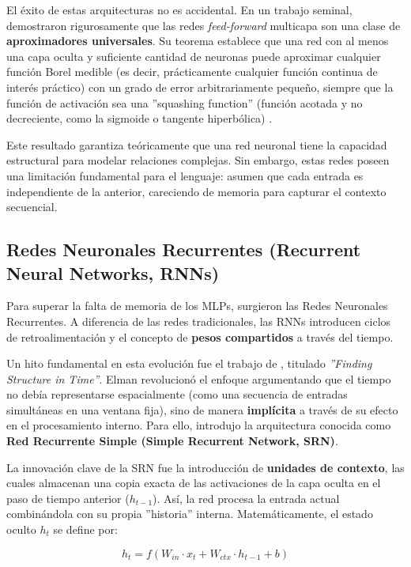 \documentclass[11pt, a4paper]{article}
\begin{document}
El éxito de estas arquitecturas no es accidental. En un trabajo seminal, \cite{hornik_multilayer_1989} demostraron rigurosamente que las redes \textit{feed-forward} multicapa son una clase de
\textbf{aproximadores universales}. Su teorema establece que una red con al menos una capa oculta y suficiente cantidad de neuronas puede aproximar cualquier función Borel medible (es decir, 
prácticamente cualquier función continua de interés práctico) con un grado de error arbitrariamente pequeño, siempre que la función de activación sea una ''squashing function'' (función acotada y
no decreciente, como la sigmoide o tangente hiperbólica) \cite{hornik_multilayer_1989}.

Este resultado garantiza teóricamente que una red neuronal tiene la capacidad estructural para modelar relaciones complejas. Sin embargo, estas redes poseen una limitación fundamental para el 
lenguaje: asumen que cada entrada es independiente de la anterior, careciendo de memoria para capturar el contexto secuencial.

\subsection{Redes Neuronales Recurrentes (Recurrent Neural Networks, RNNs)}

Para superar la falta de memoria de los MLPs, surgieron las Redes Neuronales Recurrentes. A diferencia de las redes tradicionales, las RNNs introducen ciclos de retroalimentación y el concepto 
de \textbf{pesos compartidos} a través del tiempo.

Un hito fundamental en esta evolución fue el trabajo de \cite{elman_finding_1990}, titulado \textit{''Finding Structure in Time''}. Elman revolucionó el enfoque argumentando que el tiempo no debía
representarse espacialmente (como una secuencia de entradas simultáneas en una ventana fija), sino de manera \textbf{implícita} a través de su efecto en el procesamiento interno. Para ello, introdujo 
la arquitectura conocida como \textbf{Red Recurrente Simple (Simple Recurrent Network, SRN)}.

La innovación clave de la SRN fue la introducción de \textbf{unidades de contexto}, las cuales almacenan una copia exacta de las activaciones de la capa oculta en el paso de tiempo anterior ($h_{t-1}$). 
Así, la red procesa la entrada actual combinándola con su propia ''historia'' interna. Matemáticamente, el estado oculto $h_t$ se define por:

\begin{equation}
    h_t = f(W_{in} \cdot x_t + W_{ctx} \cdot h_{t-1} + b)
\end{equation}
\end{document}
